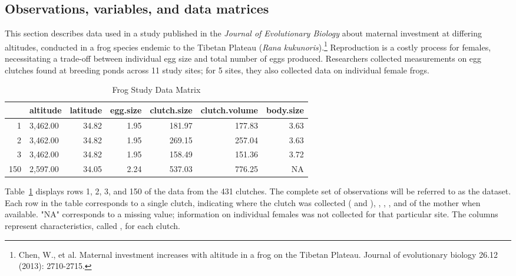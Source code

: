 \subsection{Observations, variables, and data matrices}
\label{frogDataExample}

This section describes data used in a study published in the \textit{Journal of Evolutionary Biology} about maternal investment at differing altitudes, conducted in a frog species endemic to the Tibetan Plateau (\textit{Rana kukunoris}).\footnote{ Chen, W., et al. Maternal investment increases with altitude in a frog on the Tibetan Plateau. Journal of evolutionary biology 26.12 (2013): 2710-2715.} Reproduction is a costly process for females, necessitating a trade-off between individual egg size and total number of eggs produced. Researchers collected measurements on egg clutches found at breeding ponds across 11 study sites; for 5 sites, they also collected data on individual female frogs.

\begin{table}[ht]
\centering
\begin{tabular}{rlrrrrr}
  \hline
 & altitude & latitude & egg.size & clutch.size & clutch.volume & body.size \\ 
  \hline
1 & 3,462.00 & 34.82 & 1.95 & 181.97 & 177.83 & 3.63 \\ 
  2 & 3,462.00 & 34.82 & 1.95 & 269.15 & 257.04 & 3.63 \\ 
  3 & 3,462.00 & 34.82 & 1.95 & 158.49 & 151.36 & 3.72 \\ 
  150 & 2,597.00 & 34.05 & 2.24 & 537.03 & 776.25 & NA \\ 
   \hline
\end{tabular}
\caption{Frog Study Data Matrix} 
\label{frogDF}
\end{table}

Table~\ref{frogDF} displays rows 1, 2, 3, and 150 of the data from the 431 clutches. The complete set of observations will be referred to as the  dataset. Each row in the table corresponds to a single clutch, indicating where the clutch was collected ( and ), , , , and  of the mother when available. "NA" corresponds to a missing value; information on individual females was not collected for that particular site. The columns represent characteristics, called , for each clutch.

